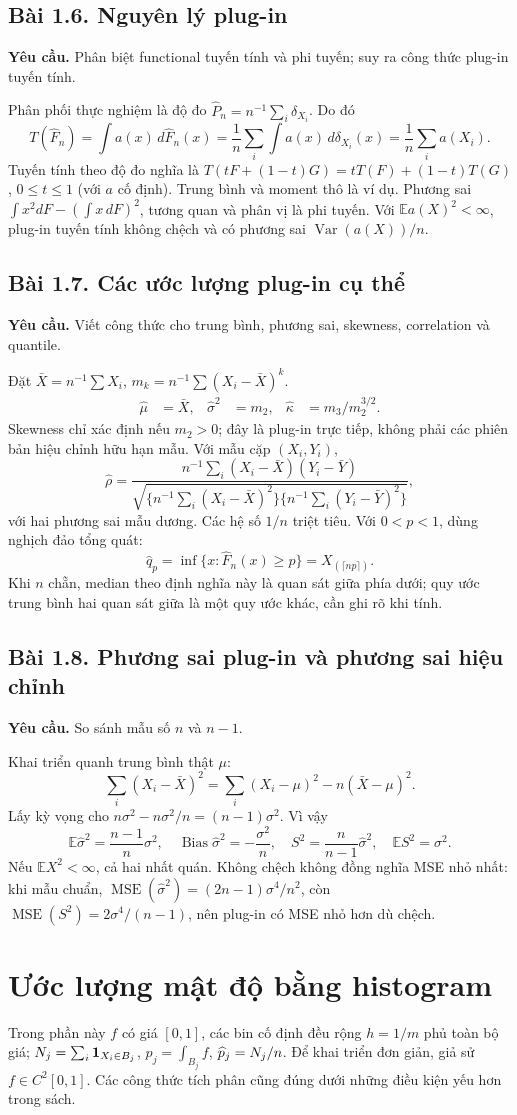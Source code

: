 \documentclass[11pt,a4paper]{article}
\newcommand{\E}{\mathbb E}\newcommand{\Pp}{\mathbb P}
\DeclareMathOperator{\Var}{Var}\DeclareMathOperator{\Cov}{Cov}
\DeclareMathOperator{\Bias}{Bias}\DeclareMathOperator{\MSE}{MSE}
\newcommand{\Fh}{\widehat F_n}\newcommand{\fh}{\widehat f_h}
\newcommand{\prob}[3]{\subsection{Bài #1. #2}\label{b:#1}\textbf{Yêu cầu.} #3\par}
\begin{document}
\prob{1.6}{Nguyên lý plug-in}{Phân biệt functional tuyến tính và phi tuyến; suy ra công thức plug-in tuyến tính.}
Phân phối thực nghiệm là độ đo $\widehat P_n=n^{-1}\sum_i\delta_{X_i}$. Do đó
\[
T(\Fh)=\int a(x)\,d\Fh(x)=\frac1n\sum_i\int a(x)\,d\delta_{X_i}(x)=\frac1n\sum_i a(X_i).
\]
Tuyến tính theo độ đo nghĩa là $T(tF+(1-t)G)=tT(F)+(1-t)T(G)$, $0\le t\le1$ (với $a$ cố định). Trung bình và moment thô là ví dụ. Phương sai $\int x^2dF-(\int x\,dF)^2$, tương quan và phân vị là phi tuyến. Với $\E a(X)^2<\infty$, plug-in tuyến tính không chệch và có phương sai $\Var(a(X))/n$.

\prob{1.7}{Các ước lượng plug-in cụ thể}{Viết công thức cho trung bình, phương sai, skewness, correlation và quantile.}
Đặt $\bar X=n^{-1}\sum X_i$, $m_k=n^{-1}\sum(X_i-\bar X)^k$.
\begin{align*}
\widehat\mu&=\bar X,&\widehat\sigma^2&=m_2,&\widehat\kappa&=m_3/m_2^{3/2}.
\end{align*}
Skewness chỉ xác định nếu $m_2>0$; đây là plug-in trực tiếp, không phải các phiên bản hiệu chỉnh hữu hạn mẫu.
Với mẫu cặp $(X_i,Y_i)$,
\[
\widehat\rho=\frac{n^{-1}\sum_i(X_i-\bar X)(Y_i-\bar Y)}{\sqrt{\{n^{-1}\sum_i(X_i-\bar X)^2\}\{n^{-1}\sum_i(Y_i-\bar Y)^2\}}},
\]
với hai phương sai mẫu dương. Các hệ số $1/n$ triệt tiêu.
Với $0<p<1$, dùng nghịch đảo tổng quát:
\[
\widehat q_p=\inf\{x:\Fh(x)\ge p\}=X_{(\lceil np\rceil)}.
\]
Khi $n$ chẵn, median theo định nghĩa này là quan sát giữa phía dưới; quy ước trung bình hai quan sát giữa là một quy ước khác, cần ghi rõ khi tính.

\prob{1.8}{Phương sai plug-in và phương sai hiệu chỉnh}{So sánh mẫu số $n$ và $n-1$.}
Khai triển quanh trung bình thật $\mu$:
\[
\sum_i(X_i-\bar X)^2=\sum_i(X_i-\mu)^2-n(\bar X-\mu)^2.
\]
Lấy kỳ vọng cho $n\sigma^2-n\sigma^2/n=(n-1)\sigma^2$. Vì vậy
\[
\E\widehat\sigma^2=\frac{n-1}{n}\sigma^2,\quad
\Bias\widehat\sigma^2=-\frac{\sigma^2}{n},\quad
S^2=\frac{n}{n-1}\widehat\sigma^2,\quad \E S^2=\sigma^2.
\]
Nếu $\E X^2<\infty$, cả hai nhất quán. Không chệch không đồng nghĩa MSE nhỏ nhất: khi mẫu chuẩn,
$\MSE(\widehat\sigma^2)=(2n-1)\sigma^4/n^2$, còn $\MSE(S^2)=2\sigma^4/(n-1)$, nên plug-in có MSE nhỏ hơn dù chệch.
\clearpage
\section{Ước lượng mật độ bằng histogram}
Trong phần này $f$ có giá $[0,1]$, các bin cố định đều rộng $h=1/m$ phủ toàn bộ giá; $N_j=\sum_i\mathbf 1_{X_i\in B_j}$, $p_j=\int_{B_j}f$, $\widehat p_j=N_j/n$. Để khai triển đơn giản, giả sử $f\in C^2[0,1]$. Các công thức tích phân cũng đúng dưới những điều kiện yếu hơn trong sách.
\end{document}
